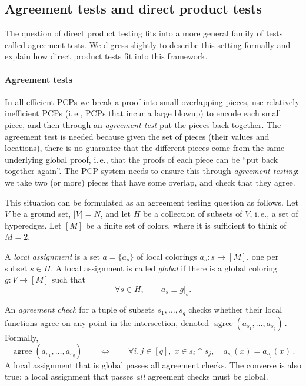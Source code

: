 \documentclass[11pt]{article}
\numberwithin{equation}{section}
\theoremstyle{definition}
\theoremstyle{plain}
\newcommand{\ie}{i.\,e.}
\newcommand{\abs}[1]{\lvert#1\rvert} %
\newcommand{\set}[1]{\{#1\}} %
\DeclareMathOperator*{\agree}{agree} %
\begin{document}
\subsection{Agreement tests and direct product tests}

The question of direct product testing fits into a more general family of tests called agreement tests. We digress slightly to describe this setting formally and explain how direct product tests fit into this framework.

\paragraph*{Agreement tests}
In all efficient PCPs we break a proof into small overlapping pieces, use relatively inefficient PCPs (\ie, PCPs that incur a large blowup) to encode each small piece, and then through an \emph{agreement test} put the pieces back together. The agreement test is needed because given the 
%
set of pieces (their values and locations), %
%
%
there is no guarantee that the different pieces come from the same underlying global proof, \ie, that the proofs of each piece can be ``put back together again''. The PCP system needs to ensure this through \emph{agreement testing}: we take two (or more) pieces that have some overlap, and check that they agree.

This situation can be formulated as an agreement testing question as follows.
%
Let $V$ be a ground set, $\abs{V} = N$, and let $H$ be a collection of subsets of $V$, %
\ie,  %
a set of hyperedges. Let $[M]$ be a finite set of colors, where it is sufficient to think of $M=2$.

A \emph{local assignment} is a 
%
set %
$a=\set{a_s}$ of local colorings $a_s:s\to [M]$, one per subset $s\in H$. A local assignment is called \emph{global} if there is a global coloring $g:V\to[M]$ such that
\[ \forall s\in H, \qquad a_s \equiv g|_s.\]

An \emph{agreement check} for a tuple of subsets $s_1,\ldots,s_q$ checks whether their local functions agree on any point in the intersection, denoted $\agree(a_{s_1},\ldots, a_{s_q})$\,. Formally,
\[ \agree(a_{s_1},\ldots, a_{s_q})  \qquad \Leftrightarrow \qquad
\forall i,j\in [q],\; x\in s_i\cap s_j, \quad a_{s_i}(x) = a_{s_j}(x)\,.\] %
A local assignment that is global passes all agreement checks. The converse is also true: a local assignment that passes \emph{all} agreement checks must be global.
\end{document}
